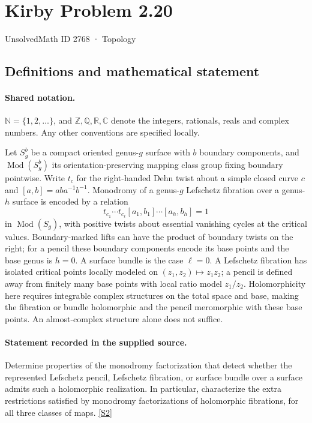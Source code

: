 \documentclass[11pt]{article}
\newcommand{\sref}[2]{\hyperlink{source:#1:#2}{[S#2]}}
\begin{document}
\setcounter{section}{2767}
\section{Kirby Problem 2.20}\label{2768}
{\small\sffamily UnsolvedMath ID 2768 · Topology}
\subsection{Definitions and mathematical statement}

\paragraph{Shared notation.}$\mathbb N=\{1,2,\ldots\}$, and $\mathbb Z,\mathbb Q,\mathbb R,\mathbb C$ denote the integers, rationals, reals and complex numbers. Any other conventions are specified locally.


Let $S_g^b$ be a compact oriented genus-$g$ surface with $b$ boundary components, and $\operatorname{Mod}(S_g^b)$ its orientation-preserving mapping class group fixing boundary pointwise. Write $t_c$ for the right-handed Dehn twist about a simple closed curve $c$ and $[a,b]=aba^{-1}b^{-1}$. Monodromy of a genus-$g$ Lefschetz fibration over a genus-$h$ surface is encoded by a relation
\[t_{c_1}\cdots t_{c_\ell}[a_1,b_1]\cdots[a_h,b_h]=1\]
in $\operatorname{Mod}(S_g)$, with positive twists about essential vanishing cycles at the critical values. Boundary-marked lifts can have the product of boundary twists on the right; for a pencil these boundary components encode its base points and the base genus is $h=0$. A surface bundle is the case $\ell=0$. A Lefschetz fibration has isolated critical points locally modeled on $(z_1,z_2)\mapsto z_1z_2$; a pencil is defined away from finitely many base points with local ratio model $z_1/z_2$. Holomorphicity here requires integrable complex structures on the total space and base, making the fibration or bundle holomorphic and the pencil meromorphic with these base points. An almost-complex structure alone does not suffice.
\paragraph{Statement recorded in the supplied source.}
Determine properties of the monodromy factorization that detect whether the represented Lefschetz pencil, Lefschetz fibration, or surface bundle over a surface admits such a holomorphic realization. In particular, characterize the extra restrictions satisfied by monodromy factorizations of holomorphic fibrations, for all three classes of maps. \sref{2768}{2}
\end{document}
